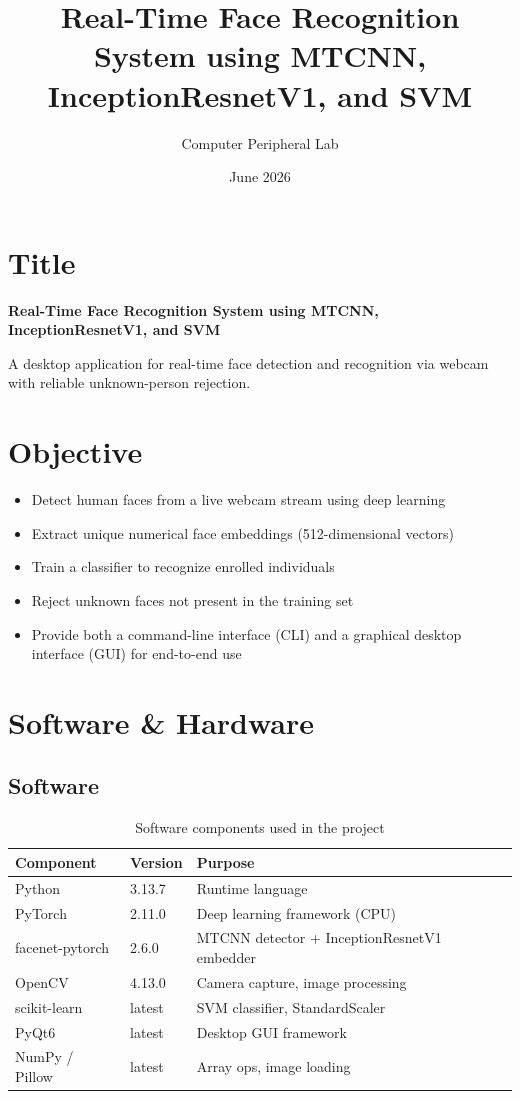 \documentclass[12pt,a4paper]{article}
\title{\textbf{Real-Time Face Recognition System using MTCNN, \\InceptionResnetV1, and SVM}}
\author{Computer Peripheral Lab}
\date{June 2026}
\begin{document}
\maketitle
\newpage

\section{Title}
\textbf{Real-Time Face Recognition System using MTCNN, InceptionResnetV1, and SVM}

A desktop application for real-time face detection and recognition via webcam with reliable unknown-person rejection.

\section{Objective}
\begin{itemize}
    \item Detect human faces from a live webcam stream using deep learning
    \item Extract unique numerical face embeddings (512-dimensional vectors)
    \item Train a classifier to recognize enrolled individuals
    \item Reject unknown faces not present in the training set
    \item Provide both a command-line interface (CLI) and a graphical desktop interface (GUI) for end-to-end use
\end{itemize}

\section{Software \& Hardware}

\subsection*{Software}
\begin{table}[H]
\centering
\begin{tabular}{lll}
\toprule
\textbf{Component} & \textbf{Version} & \textbf{Purpose} \\
\midrule
Python & 3.13.7 & Runtime language \\
PyTorch & 2.11.0 & Deep learning framework (CPU) \\
facenet-pytorch & 2.6.0 & MTCNN detector + InceptionResnetV1 embedder \\
OpenCV & 4.13.0 & Camera capture, image processing \\
scikit-learn & latest & SVM classifier, StandardScaler \\
PyQt6 & latest & Desktop GUI framework \\
NumPy / Pillow & latest & Array ops, image loading \\
\bottomrule
\end{tabular}
\caption{Software components used in the project}
\end{table}
\end{document}
